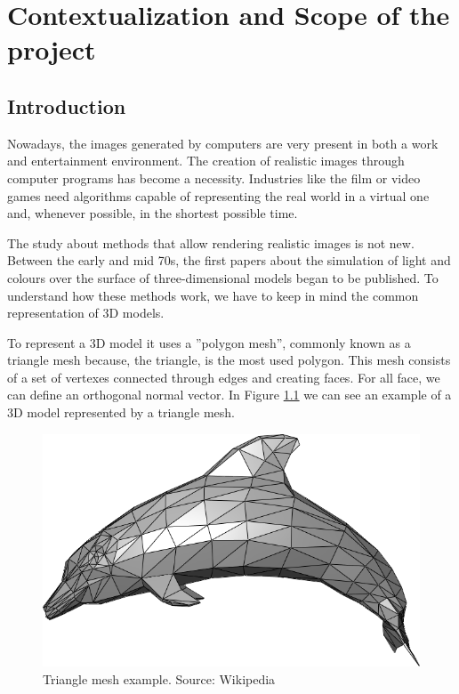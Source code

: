 \documentclass[titlepage,12pt]{report}
\begin{document}
\iftrue

\newpage
\tableofcontents*
\fi

\newpage

\chapter{Contextualization and Scope of the project}

\section{Introduction} \label{introduction}

Nowadays, the images generated by computers are very present in both a work and entertainment environment. The creation of realistic images through computer programs has become a necessity. Industries like the film or video games need algorithms capable of representing the real world in a virtual one and, whenever possible, in the shortest possible time.

The study about methods that allow rendering realistic images is not new. Between the early and mid 70s, the first papers about the simulation of light and colours over the surface of three-dimensional models began to be published. To understand how these methods work, we have to keep in mind the common representation of 3D models.

To represent a 3D model it uses a ''polygon mesh'', commonly known as a triangle mesh because, the triangle, is the most used polygon. This mesh consists of a set of vertexes connected through edges and creating faces.  For all face, we can define an orthogonal normal vector. In Figure \ref{dolphin} we can see an example of a 3D model represented by a triangle mesh.

\begin{figure}[H]
	\centering
	\includegraphics[scale=0.15]{media/Dolphin_triangle_mesh.png}
	\caption{Triangle mesh example. Source: Wikipedia}
	\label{dolphin}
\end{figure}
\end{document}
